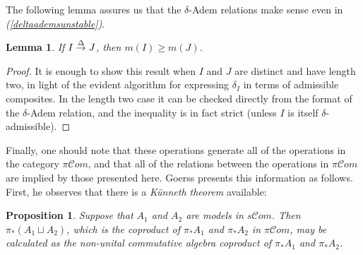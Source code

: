 \documentclass[11pt]{amsart} \renewcommand{\baselinestretch}{1.2}
\theoremstyle{plain}
\newtheorem{lem}[thm]{Lemma}
\newtheorem{prop}[thm]{Proposition}
\theoremstyle{definition}
\renewcommand{\to}{\longrightarrow}
\newcommand{\scrC}{\mathscr{C}}
\newcommand{\citeBOX}[2][]{\cite[\mbox{#1}]{#2}}
\newcommand{\deltaalg}{\Delta} %
\newcommand{\PA}[1]{\pi#1}
\newcommand{\minDimDelta}{m}
\newcommand{\produces}[3]{#3:#1\sim #2}
\renewcommand{\produces}[3]{#1\rightarrow_{#3} #2}%
\renewcommand{\produces}[3]{#1\overset{\smash{#3}}{\rightarrow} #2}%
\newcommand{\algs}{{\scrC\!\textit{om}}}
\begin{document}
\begin{Constructing homotopy operations}
The following lemma assures us that the $\delta$-Adem relations make sense even in \emph{(\ref{deltaademsunstable})}.
\begin{lem}
\label{lemOnAdemChangeInMDeltaPlain}
If $\produces{I}{J}{\deltaalg}$, then $\minDimDelta(I)\geq\minDimDelta(J)$.
\end{lem}
\begin{proof}
It is enough to show this result when $I$ and $J$ are distinct and have length two, in light of the evident algorithm for expressing $\delta_I$ in terms of admissible composites. In the length two case it can be checked directly from the format of the $\delta$-Adem relation, and the inequality is in fact strict (unless $I$ is itself $\delta$-admissible).
\end{proof}
Finally, one should note that these operations generate all of the operations in the category $\PA{\algs}$, and that all of the relations between the operations in $\PA{\algs}$ are implied by those presented here. Goerss \citeBOX[\S2]{MR1089001} presents this information as follows. First, he observes that there is a \emph{K\"unneth theorem} available:
\begin{prop}
\label{salgs homotopy kunneth}
Suppose that $A_1$ and $A_2$ are models in $s\algs$. Then $\pi_*(A_1\sqcup A_2)$, which is the coproduct of $\pi_*A_1$ and $\pi_*A_2$ in $\PA{\algs}$, may be calculated as the non-unital commutative algebra coproduct of $\pi_*A_1$ and $\pi_*A_2$.
\end{prop}

\end{Constructing homotopy operations}
\end{document}
